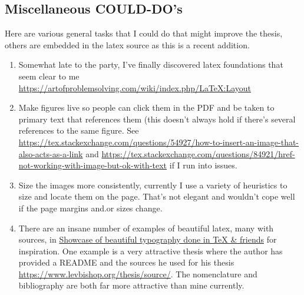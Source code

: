 \subsection{Miscellaneous COULD-DO's}
Here are various general tasks that I could do that might improve the thesis, others are embedded in the latex source as this is a recent addition.
\begin{enumerate}
    \item Somewhat late to the party, I've finally discovered latex foundations that seem clear to me \url{https://artofproblemsolving.com/wiki/index.php/LaTeX:Layout}
    
    \item Make figures live so people can click them in the PDF and be taken to primary text that references them (this doesn't always hold if there's several references to the same figure. See \url{https://tex.stackexchange.com/questions/54927/how-to-insert-an-image-that-also-acts-as-a-link} and \url{https://tex.stackexchange.com/questions/84921/href-not-working-with-image-but-ok-with-text} if I run into issues.
    
    \item Size the images more consistently, currently I use a variety of heuristics to size and locate them on the page. That's not elegant and wouldn't cope well if the page margins and.or sizes change.
    
    \item There are an insane number of examples of beautiful latex, many with sources, in \href{https://tex.stackexchange.com/questions/1319/showcase-of-beautiful-typography-done-in-tex-friends}{Showcase of beautiful typography done in TeX \& friends} for inspiration. One example is a very attractive thesis where the author has provided a README and the sources he used for his thesis \url{https://www.levbishop.org/thesis/source/}. The nomenclature and bibliography are both far more attractive than mine currently. 
    

\end{enumerate}
